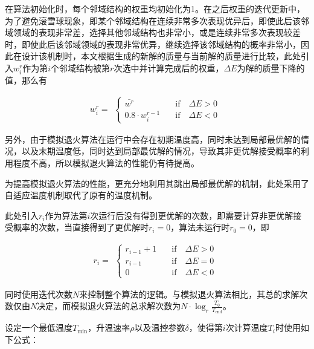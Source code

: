 在算法初始化时，每个邻域结构的权重均初始化为1。在之后权重的迭代更新中，为了避免滚雪球现象，即某个邻域结构在连续非常多次表现优异后，即使此后该邻域领域的表现非常差，选择其他邻域结构也非常小，或是连续非常多次表现较差时，即使此后该邻域领域的表现非常优异，继续选择该邻域结构的概率非常小，因此在设计该机制时，本文根据生成的新解的质量与当前解的质量进行比较，此处引入\(w^r_i\)作为第\(i\)个邻域结构被第\(r\)次选中并计算完成后的权重，\(\Delta E\)为解的质量下降的值，那么有

\begin{equation}
    w^r_i = 
    \begin{aligned}
    \begin{cases}
        \bar{w^r} \quad &\text{if} \quad \Delta E > 0 \\
        0.8 \cdot w^{r-1}_i \quad &\text{if} \quad \Delta E < 0
    \end{cases} 
    \end{aligned}\nonumber
\end{equation}


另外，由于模拟退火算法在运行中会存在初期温度高，同时未达到局部最优解的情况，以及末期温度低，同时达到局部最优解的情况，导致其非更优解接受概率的利用程度不高，所以模拟退火算法的性能仍有待提高。

为提高模拟退火算法的性能，更充分地利用其跳出局部最优解的机制，此处采用了自适应温度机制取代了原有的温度机制。

此处引入\(r_{i}\)作为算法第\(i\)次运行后没有得到更优解的次数，即需要计算非更优解接受概率的次数，当直接得到了更优解时\(r_{i} = 0\)，算法未运行时\(r_{0} = 0\)，即

\begin{equation}
    r_i = 
    \begin{aligned} 
    \begin{cases}
        r_{i-1} + 1 \quad &\text{if} \quad \Delta E > 0\\
        r_{i-1} &\text{if} \quad \Delta E = 0 \\
        0 &\text{if} \quad \Delta E < 0
    \end{cases}
    \end{aligned}
    \nonumber
\end{equation}

同时使用迭代次数\(N\)来控制整个算法的逻辑。与模拟退火算法相比，其总的求解次数仅由\(N\)决定，而模拟退火算法的总求解次数为\(N \cdot \log_{r}\frac{T_{0}}{T_{\text{end}}}\)。

设定一个最低温度\(T_{\min}\)，升温速率\(\rho\)以及温控参数\(\delta\)，使得第\(i\)次计算温度\(T_{i}\)时使用如下公式：

